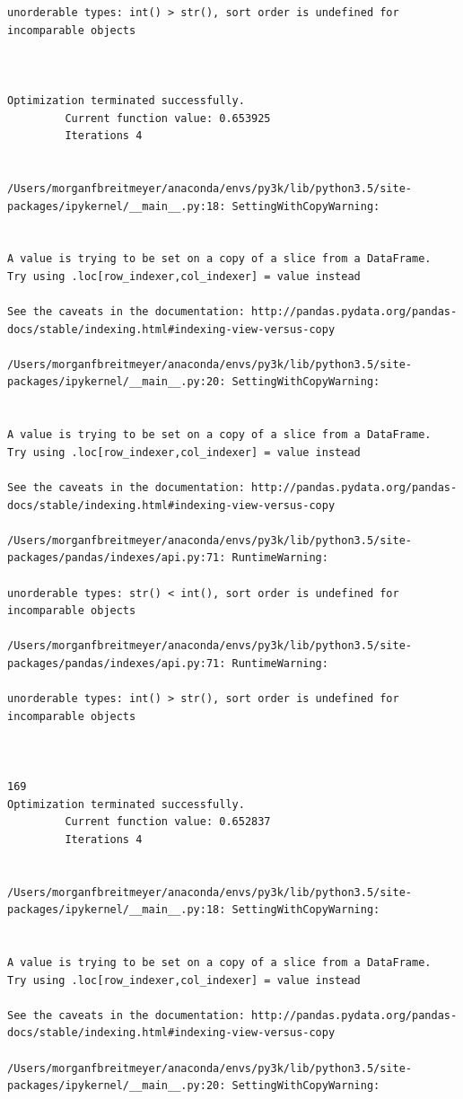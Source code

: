 \begin{lstlisting}
unorderable types: int() > str(), sort order is undefined for incomparable objects



Optimization terminated successfully.
         Current function value: 0.653925
         Iterations 4


/Users/morganfbreitmeyer/anaconda/envs/py3k/lib/python3.5/site-packages/ipykernel/__main__.py:18: SettingWithCopyWarning:


A value is trying to be set on a copy of a slice from a DataFrame.
Try using .loc[row_indexer,col_indexer] = value instead

See the caveats in the documentation: http://pandas.pydata.org/pandas-docs/stable/indexing.html#indexing-view-versus-copy

/Users/morganfbreitmeyer/anaconda/envs/py3k/lib/python3.5/site-packages/ipykernel/__main__.py:20: SettingWithCopyWarning:


A value is trying to be set on a copy of a slice from a DataFrame.
Try using .loc[row_indexer,col_indexer] = value instead

See the caveats in the documentation: http://pandas.pydata.org/pandas-docs/stable/indexing.html#indexing-view-versus-copy

/Users/morganfbreitmeyer/anaconda/envs/py3k/lib/python3.5/site-packages/pandas/indexes/api.py:71: RuntimeWarning:

unorderable types: str() < int(), sort order is undefined for incomparable objects

/Users/morganfbreitmeyer/anaconda/envs/py3k/lib/python3.5/site-packages/pandas/indexes/api.py:71: RuntimeWarning:

unorderable types: int() > str(), sort order is undefined for incomparable objects



169
Optimization terminated successfully.
         Current function value: 0.652837
         Iterations 4


/Users/morganfbreitmeyer/anaconda/envs/py3k/lib/python3.5/site-packages/ipykernel/__main__.py:18: SettingWithCopyWarning:


A value is trying to be set on a copy of a slice from a DataFrame.
Try using .loc[row_indexer,col_indexer] = value instead

See the caveats in the documentation: http://pandas.pydata.org/pandas-docs/stable/indexing.html#indexing-view-versus-copy

/Users/morganfbreitmeyer/anaconda/envs/py3k/lib/python3.5/site-packages/ipykernel/__main__.py:20: SettingWithCopyWarning:



\end{lstlisting}
